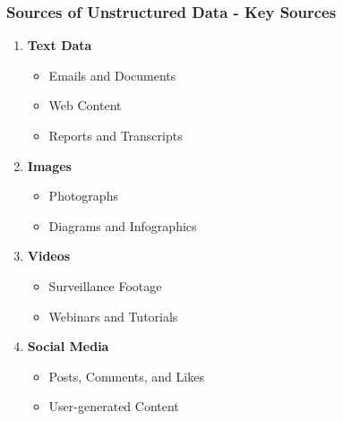 \documentclass[aspectratio=169]{beamer}
\begin{document}
\begin{frame}[fragile]
    \frametitle{Sources of Unstructured Data - Key Sources}
    \begin{enumerate}
        \item \textbf{Text Data}
            \begin{itemize}
                \item Emails and Documents
                \item Web Content
                \item Reports and Transcripts
            \end{itemize}
        \item \textbf{Images}
            \begin{itemize}
                \item Photographs
                \item Diagrams and Infographics
            \end{itemize}
        \item \textbf{Videos}
            \begin{itemize}
                \item Surveillance Footage
                \item Webinars and Tutorials
            \end{itemize}
        \item \textbf{Social Media}
            \begin{itemize}
                \item Posts, Comments, and Likes
                \item User-generated Content
            \end{itemize}
    \end{enumerate}
\end{frame}
\end{document}
